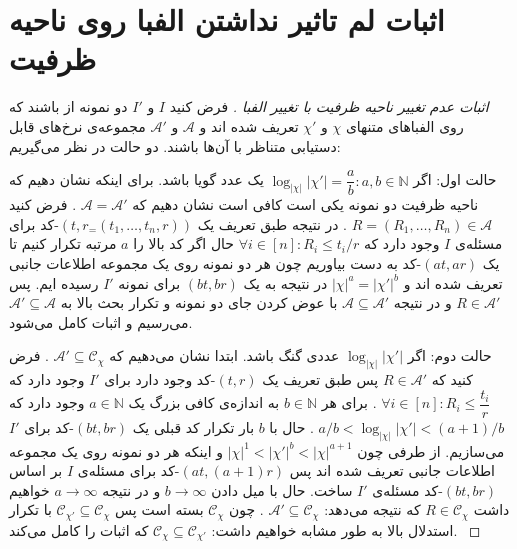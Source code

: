 \chapter{اثبات لم تاثیر نداشتن الفبا روی ناحیه ظرفیت}
\label{appendix:l1}

\begin{proof}[
	اثبات عدم تغییر ناحیه ظرفیت با تغییر الفبا
	]
	فرض کنید
	$I$
	و
	$I'$
	دو نمونه از 
	\icod
	باشند که روی الفباهای متنهای
	$\chi$
	و
	$\chi'$
	تعریف شده اند و
	$\mathscr{A}$
	و
	$ \mathscr{A}'$
	مجموعه‌ی نرخ‌های قابل دستیابی متناظر با آن‌ها باشند.
	دو حالت در نظر می‌گیریم:
	
	حالت اول: اگر
	$\log_{|\chi|} |\chi'| = \dfrac{a}{b}: a, b \in \mathbb{N}$
	یک عدد گویا باشد. برای اینکه نشان دهیم که ناحیه ظرفیت دو نمونه یکی است کافی است نشان دهیم که
	$\mathscr{A} = \mathscr{A}'$
	. فرض کنید
	$R = (R_1, \ldots, R_n) \in \mathscr{A}$
	. در نتیجه طبق تعریف یک 
	$(t, r_ = (t_1, \ldots, t_n, r))$-کد
	برای مسئله‌ی
	$I$
	وجود دارد که
	$\forall i \in [n]: R_i \leq t_i / r$
	حال اگر کد بالا را
	$a$
	مرتبه تکرار کنیم تا یک
	$(at, ar)$-کد
	به دست بیاوریم چون هر دو نمونه روی یک مجموعه اطلاعات جانبی تعریف شده اند و 
	$|\chi|^a = |\chi'|^b$
	در نتیجه به یک
	$(bt, br)$
	برای نمونه
	$I'$
	رسیده ایم. پس
	$R \in \mathscr{A}'$
	و در نتیجه
	$\mathscr{A} \subseteq \mathscr{A}'$
	با عوض کردن جای دو نمونه و تکرار بحث بالا به
		$\mathscr{A}' \subseteq \mathscr{A}$
		می‌رسیم و اثبات کامل می‌شود.
		
		حالت دوم: اگر
		$\log_{|\chi|} |\chi'| $
		عددی گنگ باشد. ابتدا نشان می‌دهیم که
		$\mathscr{A}' \subseteq \mathscr{C}_{\chi}$
		. فرض کنید که
		$R \in \mathscr{A}'$
		پس طبق تعریف یک
		$(t, r)$-کد
		وجود دارد برای
		$I'$
		وجود دارد که
		$\forall i \in [n]: R_i \leq \dfrac{t_i}{r}$
		. برای هر
		$b \in \mathbb{N}$
		به اندازه‌ی کافی بزرگ یک
		$a \in \mathbb{N}$
		وجود دارد که
		$a/b < \log_{|\chi|} |\chi'| < (a+1)/b$
		. حال با
		$b$
		بار تکرار کد قبلی یک 
		$(bt, br)$-کد
		برای
		$I'$
		می‌سازیم. از طرفی چون
		$|\chi|^1 < |\chi'|^b < |\chi|^{a + 1}$
		و اینکه هر دو نمونه روی یک مجموعه اطلاعات جانبی تعریف شده اند پس
		$(at, (a+1)r)$-کد
		برای مسئله‌ی
		$I$
		بر اساس
		$(bt, br)$-کد
		 مسئله‌ی
		 $I'$
		 ساخت. حال با میل دادن
		 $b \rightarrow \infty$
		 و در نتیجه
		 $a \rightarrow \infty$
		 خواهیم داشت
		 $R \in \mathscr{C}_{\chi}$
		  که نتیجه می‌دهد:
		  $\mathscr{A}' \subseteq \mathscr{C}_{\chi}$
		  . چون
		  $\mathscr{C}_{\chi}$
		  بسته است پس
		  $\mathscr{C}_{\chi'} \subseteq \mathscr{C}_{\chi}$
		  با تکرار استدلال بالا به طور مشابه خواهیم داشت:
		  $\mathscr{C}_{\chi} \subseteq \mathscr{C}_{\chi'}$
		  که اثبات را کامل می‌کند.
		  \cite{fatemehbook}
\end{proof}

